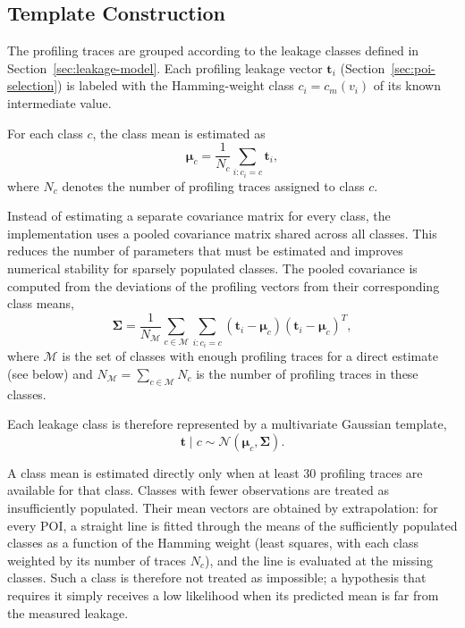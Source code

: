 \documentclass[conference]{IEEEtran}
\begin{document}
\subsection{Template Construction}
\label{sec:template-construction}

The profiling traces are grouped according to the leakage classes defined in Section~\ref{sec:leakage-model}.
Each profiling leakage vector $\mathbf{t}_i$ (Section~\ref{sec:poi-selection}) is labeled with the Hamming-weight class $c_i = c_m(v_i)$ of its known intermediate value.

For each class $c$, the class mean is estimated as
\begin{equation*}
	\boldsymbol{\mu}_c =
	\frac{1}{N_c}
	\sum_{i:c_i=c}
	\mathbf{t}_i,
\end{equation*}
where $N_c$ denotes the number of profiling traces assigned to class $c$.

Instead of estimating a separate covariance matrix for every class, the implementation uses a pooled covariance matrix shared across all classes.
This reduces the number of parameters that must be estimated and improves numerical stability for sparsely populated classes.
The pooled covariance is computed from the deviations of the profiling vectors from their corresponding class means,
\begin{equation*}
	\boldsymbol{\Sigma}
	=
	\frac{1}{N_{\mathcal{M}}}
	\sum_{c\in\mathcal{M}}
	\sum_{i:c_i=c}
	\left(
	\mathbf{t}_i-\boldsymbol{\mu}_c
	\right)
	\left(
	\mathbf{t}_i-\boldsymbol{\mu}_c
	\right)^{T},
\end{equation*}
where $\mathcal{M}$ is the set of classes with enough profiling traces for a direct estimate (see below) and $N_{\mathcal{M}}=\sum_{c\in\mathcal{M}}N_c$ is the number of profiling traces in these classes.

Each leakage class is therefore represented by a multivariate Gaussian template,
\begin{equation*}
	\mathbf{t}\mid c
	\sim
	\mathcal{N}
	\left(
	\boldsymbol{\mu}_c,
	\boldsymbol{\Sigma}
	\right).
\end{equation*}

A class mean is estimated directly only when at least $30$ profiling traces are available for that class.
Classes with fewer observations are treated as insufficiently populated.
Their mean vectors are obtained by extrapolation: for every POI, a straight line is fitted through the means of the sufficiently populated classes as a function of the Hamming weight (least squares, with each class weighted by its number of traces $N_c$), and the line is evaluated at the missing classes.
Such a class is therefore not treated as impossible; a hypothesis that requires it simply receives a low likelihood when its predicted mean is far from the measured leakage.
\end{document}
